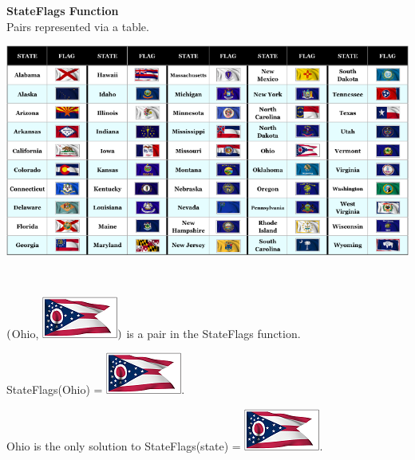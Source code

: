 \documentclass{ximera}
\begin{document}
\begin{center}
\textbf{StateFlags Function} \\
Pairs represented via a table. \\
\begin{image}
\includegraphics{pics/allStateFlags_med.png}
\end{image}
\end{center}



\quad \\



\begin{example}

$\Large{(}$Ohio, \includegraphics{pics/StateFlags/Ohio.png}$\Large{)}$ is a pair in the StateFlags function.

StateFlags(Ohio) = \includegraphics{pics/StateFlags/Ohio.png}.

Ohio is the only solution to StateFlags(state) = \includegraphics{pics/StateFlags/Ohio.png}.

\end{example}

\quad \\
\end{document}

